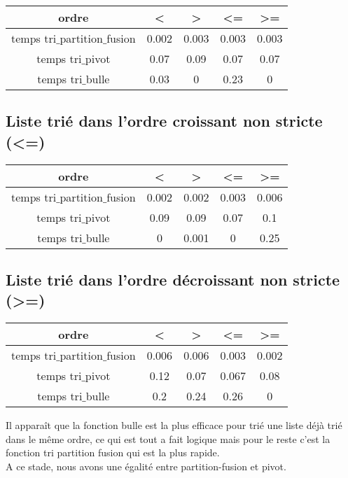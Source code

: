 \documentclass[a4paper, 12pt]{article}
\begin{document}
\begin{center}
\begin{tabular}{|c|c|c|c|c|}
\hline 
ordre & < & > & <= & >= \\ 
\hline 
temps tri$\_$partition$\_$fusion & 0.002 & 0.003 &0.003 & 0.003 \\ 
\hline 
temps tri$\_$pivot & 0.07 & 0.09 & 0.07 & 0.07\\ 
\hline 
temps tri$\_$bulle & 0.03 & 0 & 0.23 & 0 \\ 
\hline  
\end{tabular} 
\end{center}

\subsection{Liste trié dans l'ordre croissant non stricte (<=)}

\begin{center}
\begin{tabular}{|c|c|c|c|c|}
\hline 
ordre & < & > & <= & >= \\ 
\hline 
temps tri$\_$partition$\_$fusion & 0.002 & 0.002 &0.003 & 0.006 \\ 
\hline 
temps tri$\_$pivot & 0.09 & 0.09 & 0.07 & 0.1\\ 
\hline 
temps tri$\_$bulle & 0 & 0.001 & 0 & 0.25 \\ 
\hline 
\end{tabular}
\end{center} 

\subsection{Liste trié dans l'ordre décroissant non stricte (>=)}

\begin{center}
\begin{tabular}{|c|c|c|c|c|}
\hline 
ordre & < & > & <= & >= \\ 
\hline 
temps tri$\_$partition$\_$fusion & 0.006 & 0.006 &0.003 & 0.002 \\ 
\hline 
temps tri$\_$pivot & 0.12 & 0.07 & 0.067 & 0.08\\ 
\hline 
temps tri$\_$bulle & 0.2 & 0.24 & 0.26 & 0 \\ 
\hline  
\end{tabular}
\end{center} 

Il apparaît que la fonction bulle est la plus efficace pour trié une liste déjà trié dans le même ordre, ce qui est tout a fait logique mais pour le reste c'est la fonction tri partition fusion qui est la plus rapide. \\

A ce stade, nous avons une égalité entre partition-fusion et pivot.
 
\end{document}
